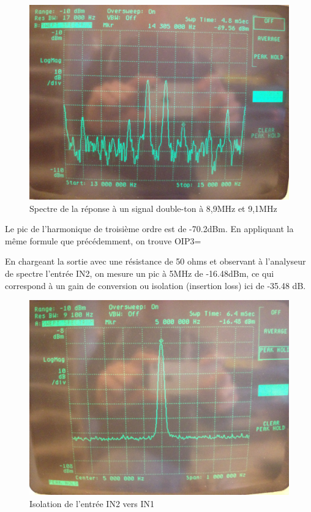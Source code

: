 \documentclass{article}
\begin{document}
\begin{figure}[h!]
	\centering
	\includegraphics[width=.7\textwidth]{11_3_4(2eme_point)}
	\caption{Spectre de la réponse à un signal double-ton à 8,9MHz et 9,1MHz}
	\label{fig:11_3_4}
\end{figure}

Le pic de l'harmonique de troisième ordre est de -70.2dBm.
En appliquant la même formule que précédemment, on trouve OIP3=


En chargeant la sortie avec une résistance de 50 ohms et observant à l'analyseur de spectre l'entrée IN2, on mesure un pic à 5MHz de -16.48dBm, ce qui correspond à un gain de conversion ou isolation  (insertion loss) ici de -35.48 dB.

\begin{figure}[h!]
	\centering
	\includegraphics[width=.7\textwidth]{11_3_5}
	\caption{Isolation de l'entrée IN2 vers IN1}
	\label{fig:11_3_5}
\end{figure}
\end{document}
